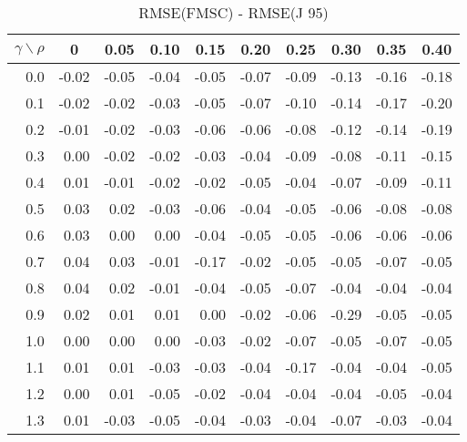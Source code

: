 \documentclass[12pt]{article}
\begin{document}
\begin{table}[!tbp]
\caption{RMSE(FMSC) - RMSE(J 95)}
 \begin{center}
 \begin{tabular}{r|rrrrrrrrr}\hline\hline
\multicolumn{1}{c|}{$\gamma\backslash\rho$}&\multicolumn{1}{c}{0}&\multicolumn{1}{c}{0.05}&\multicolumn{1}{c}{0.10}&\multicolumn{1}{c}{0.15}&\multicolumn{1}{c}{0.20}&\multicolumn{1}{c}{0.25}&\multicolumn{1}{c}{0.30}&\multicolumn{1}{c}{0.35}&\multicolumn{1}{c}{0.40}\tabularnewline
\hline

0.0&-0.02&-0.05&-0.04&-0.05&-0.07&-0.09&-0.13&-0.16&-0.18\tabularnewline
0.1&-0.02&-0.02&-0.03&-0.05&-0.07&-0.10&-0.14&-0.17&-0.20\tabularnewline
0.2&-0.01&-0.02&-0.03&-0.06&-0.06&-0.08&-0.12&-0.14&-0.19\tabularnewline
0.3& 0.00&-0.02&-0.02&-0.03&-0.04&-0.09&-0.08&-0.11&-0.15\tabularnewline
0.4& 0.01&-0.01&-0.02&-0.02&-0.05&-0.04&-0.07&-0.09&-0.11\tabularnewline
0.5& 0.03& 0.02&-0.03&-0.06&-0.04&-0.05&-0.06&-0.08&-0.08\tabularnewline
0.6& 0.03& 0.00& 0.00&-0.04&-0.05&-0.05&-0.06&-0.06&-0.06\tabularnewline
0.7& 0.04& 0.03&-0.01&-0.17&-0.02&-0.05&-0.05&-0.07&-0.05\tabularnewline
0.8& 0.04& 0.02&-0.01&-0.04&-0.05&-0.07&-0.04&-0.04&-0.04\tabularnewline
0.9& 0.02& 0.01& 0.01& 0.00&-0.02&-0.06&-0.29&-0.05&-0.05\tabularnewline
1.0& 0.00& 0.00& 0.00&-0.03&-0.02&-0.07&-0.05&-0.07&-0.05\tabularnewline
1.1& 0.01& 0.01&-0.03&-0.03&-0.04&-0.17&-0.04&-0.04&-0.05\tabularnewline
1.2& 0.00& 0.01&-0.05&-0.02&-0.04&-0.04&-0.04&-0.05&-0.04\tabularnewline
1.3& 0.01&-0.03&-0.05&-0.04&-0.03&-0.04&-0.07&-0.03&-0.04\tabularnewline
\hline
\end{tabular}

\end{center}

\end{table}

%
\end{document}
